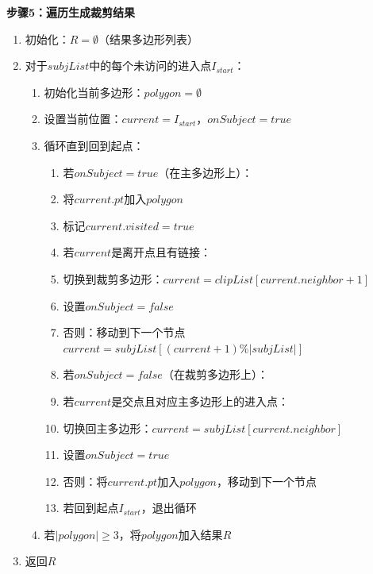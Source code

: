 \documentclass[12pt,a4paper]{article}
\begin{document}
\begin{tcolorbox}
\textbf{步骤5：遍历生成裁剪结果}
\begin{enumerate}
    \item 初始化：$R = \emptyset$（结果多边形列表）
    \item 对于$subjList$中的每个未访问的进入点$I_{start}$：
    \begin{enumerate}
        \item 初始化当前多边形：$polygon = \emptyset$
        \item 设置当前位置：$current = I_{start}$，$onSubject = true$
        \item 循环直到回到起点：
        \begin{enumerate}
            \item 若$onSubject = true$（在主多边形上）：
            \item \quad 将$current.pt$加入$polygon$
            \item \quad 标记$current.visited = true$
            \item \quad 若$current$是离开点且有链接：
            \item \quad \quad 切换到裁剪多边形：$current = clipList[current.neighbor + 1]$
            \item \quad \quad 设置$onSubject = false$
            \item \quad 否则：移动到下一个节点$current = subjList[(current+1) \% |subjList|]$
            \item 若$onSubject = false$（在裁剪多边形上）：
            \item \quad 若$current$是交点且对应主多边形上的进入点：
            \item \quad \quad 切换回主多边形：$current = subjList[current.neighbor]$
            \item \quad \quad 设置$onSubject = true$
            \item \quad 否则：将$current.pt$加入$polygon$，移动到下一个节点
            \item 若回到起点$I_{start}$，退出循环
        \end{enumerate}
        \item 若$|polygon| \geq 3$，将$polygon$加入结果$R$
    \end{enumerate}
    \item 返回$R$
\end{enumerate}


\end{tcolorbox}
\end{document}
